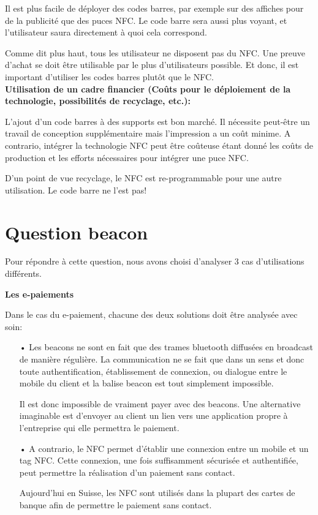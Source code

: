 \documentclass[12pt]{article}
\begin{document}
Il est plus facile de déployer des codes barres, par exemple sur des affiches pour de la publicité que des puces NFC. Le code  barre sera aussi plus voyant, et l'utilisateur saura directement à quoi cela correspond.

Comme dit plus haut, tous les utilisateur ne disposent pas du NFC.
Une preuve d'achat se doit être utilisable par le plus d'utilisateurs possible. Et donc, il est important d'utiliser les codes barres plutôt que le NFC. \\

\textbf{Utilisation de un cadre financier (Coûts pour le déploiement de la technologie, possibilités de recyclage, etc.):}
\medskip

L'ajout d'un code barres à des supports est bon marché. Il nécessite peut-être un travail de conception supplémentaire mais l'impression a un coût minime.
A contrario, intégrer la technologie NFC peut être coûteuse étant donné les coûts de production et les efforts nécessaires pour intégrer une puce NFC.

D'un point de vue recyclage, le NFC est re-programmable pour une autre utilisation. Le code barre ne l'est pas!

\section*{Question beacon}

Pour répondre à cette question, nous avons choisi d'analyser 3 cas d'utilisations différents.

\textbf{Les e-paiements}\label{epaiement}
\medskip

Dans le cas du e-paiement, chacune des deux solutions doit être analysée avec soin:

\begin{enumerate}
\item[•] Les beacons ne sont en fait que des trames bluetooth diffusées en broadcast de manière régulière. La communication ne se fait que dans un sens et donc toute authentification, établissement de connexion, ou dialogue entre le mobile du client et la balise beacon est tout simplement impossible.

Il est donc impossible de vraiment payer avec des beacons. Une alternative imaginable est d'envoyer au client un lien vers une application propre à l'entreprise qui elle permettra le paiement. 

\item[•] A contrario, le NFC permet d'établir une connexion entre un mobile et un tag NFC. Cette connexion, une fois suffisamment sécurisée et authentifiée, peut permettre la réalisation d'un paiement sans contact. 

Aujourd'hui en Suisse, les NFC sont utilisés dans la plupart des cartes de banque afin de permettre le paiement sans contact.
\end{enumerate}
\end{document}
